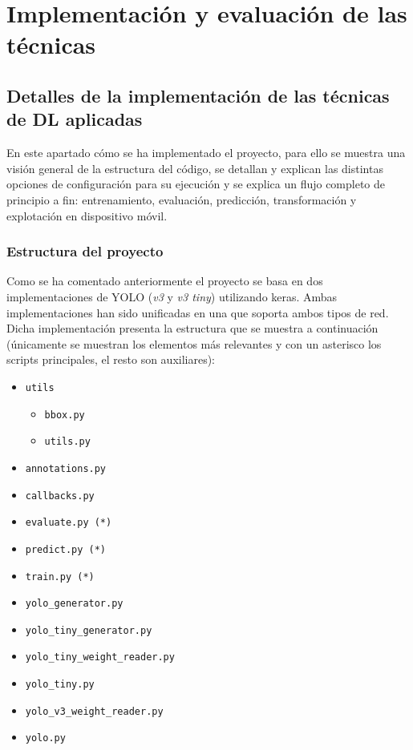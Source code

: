 \section{Implementación y evaluación de las técnicas}
\label{sec:implementacion_y_evaluacion_de_las_tecnicas}


\subsection{Detalles de la implementación de las técnicas de DL aplicadas}


En este apartado cómo se ha implementado el proyecto, para ello se muestra una visión general de la estructura del código, se detallan y explican las distintas opciones de configuración para su ejecución y se explica un flujo completo de principio a fin: entrenamiento, evaluación, predicción, transformación y explotación en dispositivo móvil.

\subsubsection*{Estructura del proyecto}

Como se ha comentado anteriormente el proyecto se basa en dos implementaciones de YOLO (\textit{v3} y \textit{v3 tiny}) utilizando keras. Ambas implementaciones han sido unificadas en una que soporta ambos tipos de red. Dicha implementación presenta la estructura que se muestra a continuación (únicamente se muestran los elementos más relevantes y con un asterisco los scripts principales, el resto son auxiliares):

\begin{itemize}
	\item \texttt{utils}
	\begin{itemize}
		\item \texttt{bbox.py}
		\item \texttt{utils.py}
	\end{itemize}
	\item \texttt{annotations.py}
	\item \texttt{callbacks.py}
	\item \texttt{evaluate.py (*)}
	\item \texttt{predict.py (*)}
	\item \texttt{train.py (*)}
	\item \texttt{yolo\_generator.py}
	\item \texttt{yolo\_tiny\_generator.py}
	\item \texttt{yolo\_tiny\_weight\_reader.py}
	\item \texttt{yolo\_tiny.py}
	\item \texttt{yolo\_v3\_weight\_reader.py}
	\item \texttt{yolo.py}
\end{itemize}

